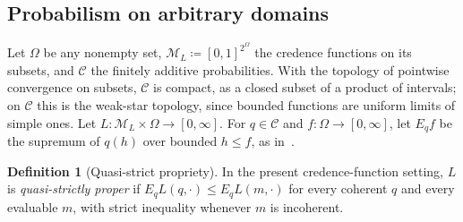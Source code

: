 \documentclass[11pt]{article}
\theoremstyle{definition}
\newtheorem{definition}[theorem]{Definition}
\theoremstyle{remark}
\newcommand{\M}{\mathcal M}
\newcommand{\C}{\mathcal C}
\begin{document}
\subsection{Probabilism on arbitrary domains}\label{sec:nielsen}
Let $\Omega$ be any nonempty set, $\M_L\coloneqq[0,1]^{2^\Omega}$ the credence functions on its subsets, and $\C$ the finitely additive probabilities. With the topology of pointwise convergence on subsets, $\C$ is compact, as a closed subset of a product of intervals; on $\C$ this is the weak-star topology, since bounded functions are uniform limits of simple ones. Let $L:\M_L\times\Omega\to[0,\infty]$. For $q\in\C$ and $f:\Omega\to[0,\infty]$, let $E_qf$ be the supremum of $q(h)$ over bounded $h\le f$, as in~\cite[Appendix~A]{Nielsen}.

\begin{definition}[Quasi-strict propriety]\label{def:quasi-propriety}
In the present credence-function setting, $L$ is \emph{quasi-strictly proper} if
$E_qL(q,\cdot)\le E_qL(m,\cdot)$ for every coherent $q$ and every evaluable $m$,
with strict inequality whenever $m$ is incoherent.
\end{definition}
\end{document}
